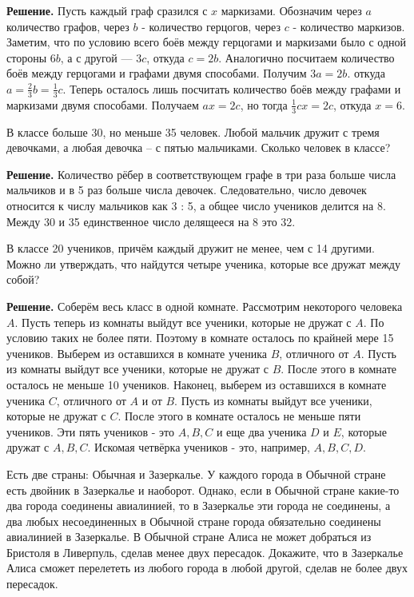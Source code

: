 \textbf{Решение.}
Пусть каждый граф сразился с $x$ маркизами. Обозначим через $a$ количество графов, через $b$ - количество герцогов, через $c$ - количество маркизов. Заметим, что по условию всего боёв между герцогами и маркизами было с одной стороны $6 b$, а с другой — $3 c$, откуда $c=2 b$. Аналогично посчитаем количество боёв между герцогами и графами двумя способами. Получим $3 a=2 b$. откуда $a=\frac{2}{3} b=\frac{1}{3} c$. Теперь осталось лишь посчитать количество боёв между графами и маркизами двумя способами. Получаем $a x=2 c$, но тогда $\frac{1}{3} c x=2 c$, откуда $x=6$.

В классе больше 30, но меньше 35 человек. Любой мальчик дружит с тремя девочками, а любая девочка – с пятью мальчиками. Сколько человек в классе?

\textbf{Решение.}
Количество рёбер в соответствующем графе в три раза больше числа мальчиков и в 5 раз больше числа девочек. Следовательно, число девочек относится к числу мальчиков как  3 : 5,  а общее число учеников делится на 8. Между 30 и 35 единственное число делящееся на 8 это 32. 

В классе 20 учеников, причём каждый дружит не менее, чем с 14 другими. Можно ли утверждать, что найдутся четыре ученика, которые все дружат между собой?

\textbf{Решение.}
Соберём весь класс в одной комнате. Рассмотрим некоторого человека $A$. Пусть теперь из комнаты выйдут все ученики, которые не дружат с $A$. По условию таких не более пяти. Поэтому в комнате осталось по крайней мере 15 учеников. Выберем из оставшихся в комнате ученика $B$, отличного от $A$. Пусть из комнаты выйдут все ученики, которые не дружат с $B$. После этого в комнате осталось не меньше 10 учеников. Наконец, выберем из оставшихся в комнате ученика $C$, отличного от $A$ и от $B$. Пусть из комнаты выйдут все ученики, которые не дружат с $C$. После этого в комнате осталось не меньше пяти учеников. Эти пять учеников - это $A, B, C$ и еще два ученика $D$ и $E$, которые дружат с $A, B, C$. Искомая четвёрка учеников - это, например, $A, B, C, D.$

Есть две страны: Обычная и Зазеркалье. У каждого города в Обычной стране есть двойник в Зазеркалье и наоборот. Однако, если в Обычной стране какие-то два города соединены авиалинией, то в Зазеркалье эти города не соединены, а два любых несоединенных в Обычной стране города обязательно соединены авиалинией в Зазеркалье. В Обычной стране Алиса не может добраться из Бристоля в Ливерпуль, сделав менее двух пересадок. Докажите, что в Зазеркалье Алиса сможет перелететь из любого города в любой другой, сделав не более двух пересадок.

